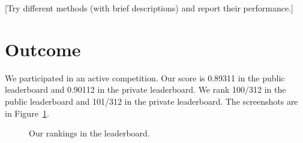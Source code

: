 \documentclass[11pt]{article}
\numberwithin{equation}{section}
\begin{document}
[Try different methods (with brief descriptions) and report their performance.]



\section{Outcome}


We participated in an active competition.
Our score is 0.89311 in the public leaderboard and 0.90112 in the private leaderboard.
We rank 100/312 in the public leaderboard and 101/312 in the private leaderboard.
The screenshots are in Figure~\ref{fig:leaderboard}.





\begin{figure}
	\begin{center}
	\end{center}
	\caption{Our rankings in the leaderboard.}
	\label{fig:leaderboard}
\end{figure}



%



\end{document}
